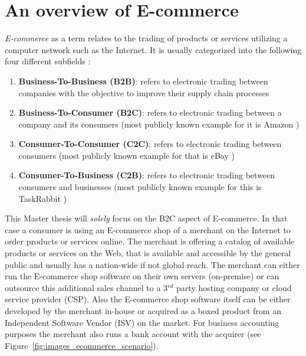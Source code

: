 
\section{An overview of \gls{E-commerce}}
\label{sec:e_commerce_scenario}

\emph{\gls{E-commerce}} as a term relates to the trading of products or services utilizing a computer network such as the Internet. It is usually categorized into the following four different subfields \citep{sen2015study}:\@

\begin{enumerate}
  \item \textbf{Business-To-Business (\gls{B2B})}: refers to electronic trading between companies with the objective to improve their supply chain processes
  \item \textbf{Business-To-Consumer (\gls{B2C})}: refers to electronic trading between a company and its consumers (most publicly known example for it is Amazon \citep{Amazon.com})
  \item \textbf{Consumer-To-Consumer (\gls{C2C})}: refers to electronic trading between consumers (most publicly known example for that is eBay \citep{eBayInc})
  \item \textbf{Consumer-To-Business (\gls{C2B})}: refers to electronic trading between consumers and businesses (most publicly known example for this is TaskRabbit \citep{TaskRabbit})
\end{enumerate}

This Master thesis will \emph{solely} focus on the \gls{B2C} aspect of \gls{E-commerce}. In that case a consumer is using an \gls{E-commerce} shop of a merchant on the Internet to order products or services online. The merchant is offering a catalog of available products or services on the Web, that is available and accessible by the general public and usually has a nation-wide if not global reach. The merchant can either run the \gls{E-commerce} shop software on their own servers (on-premise) or can outsource this additional sales channel to a 3$^{rd}$ party hosting company or cloud service provider (\gls{CSP}). Also the \gls{E-commerce} shop software itself can be either developed by the merchant in-house or acquired as a boxed product from an Independent Software Vendor (\gls{ISV}) on the market. For business accounting purposes the merchant also runs a bank account with the acquirer (see Figure~\ref{fig:images_ecommerce_scenario}). \\

